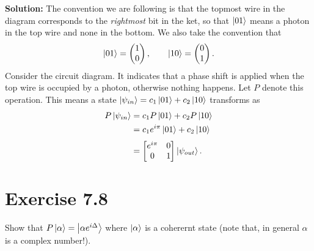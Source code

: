 \documentclass{book}
\begin{document}
    \textbf{Solution:} The convention we are following is that the topmost wire in the diagram corresponds to the \emph{rightmost} bit in the ket, so that $\ket{01}$ means a photon in the top wire and none in the bottom. We also take the convention that 
    \begin{align}
        \ket{01} = \begin{pmatrix}
            1 \\
            0
        \end{pmatrix}, \qquad \ket{10} = \begin{pmatrix}
            0 \\
            1
        \end{pmatrix}.
    \end{align}
    Consider the circuit diagram. It indicates that a phase shift is applied when the top wire is occupied by a photon, otherwise nothing happens. Let $P$ denote this operation. This means a state $\ket{\psi_{in}} = c_1 \ket{01} + c_2 \ket{10}$ transforms as
    \begin{align}
    \begin{aligned}
        P \ket{\psi_{in}} &= c_1 P \ket{01} + c_2 P \ket{10}\\ 
        &= c_1 e^{i\pi}\ket{01} + c_2 \ket{10}\\[0.7ex]
        &= \begin{bmatrix}
            e^{i\pi} & 0 \\
            0 & 1
        \end{bmatrix} \ket{\psi_{out}}.
    \end{aligned}
    \end{align}

\section*{Exercise 7.8}
    Show that $P\ket{\alpha} = \ket{\alpha e^{i\Delta}}$ where $\ket{\alpha}$ is a coherernt state (note that, in general $\alpha$ is a complex number!).
\end{document}
